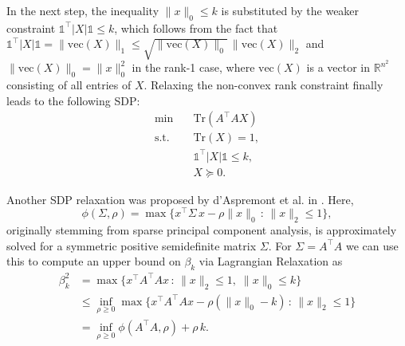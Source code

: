 \documentclass[journal]{IEEEtran}
\newcommand{\suchthat}{\,:\,}
\newcommand{\abs}[1]{\lvert{#1}\rvert}
\newcommand{\Norm}[2]{\lVert{#1}\rVert_{#2}}
\newcommand{\T}{^{\top}}
\newcommand{\Tr}{\text{Tr}}
\newcommand{\vect}{\text{vec}}
\newcommand{\R}{\mathds{R}}
\newcommand{\ones}{\mathds{1}}
\begin{document}
In the next step, the inequality $\Norm{x}{0} \leq k$ is substituted by the weaker constraint $\ones\T
\abs{X} \ones \leq k$, which follows from the fact that $\ones\T\abs{X} \ones = \Norm{\vect(X)}{1}\leq \sqrt{\Norm{\vect(X)}{0}}\, \Norm{\vect(X)}{2}$ and $\Norm{\vect(X)}{0}=\Norm{x}{0}^2$ in the rank-1 case, where $\vect(X)$ is a vector
in $\R^{n^2}$ consisting of all entries of $X$. 
Relaxing the non-convex rank constraint finally leads to the following SDP:
\begin{equation}\label{Asp07}\tag{A1}
 \begin{aligned}
  \min \quad & \Tr(A\T A X) \\
  \text{s.t.} \quad & \Tr(X) = 1, \\
  & \ones\T \abs{X} \ones \leq k, \\
  & X \succeq 0. \nonumber
 \end{aligned}
\end{equation}

Another SDP relaxation was proposed by d'Aspremont et al. in \cite{Asp08}. Here,
\begin{equation}\label{phi}
  \phi(\Sigma, \rho) = \max \big\{ x\T \Sigma\, x - \rho \Norm{x}{0} \suchthat \Norm{x}{2} \leq 1 \big\},
\end{equation}
originally stemming from sparse principal component analysis, is approximately solved for a symmetric positive semidefinite matrix $\Sigma$. For
$\Sigma = A\T A$ we can use this to compute an upper bound on $\beta_k$ via Lagrangian Relaxation as
 \begin{align*}
  \beta_k^2 & = \max \big\{ x\T A\T A x \suchthat \Norm{x}{2} \leq 1,\; \Norm{x}{0} \leq k \big\} \\
	    & \leq \inf_{\rho \geq 0} \max \big\{ x\T A\T A x - \rho 
            (\Norm{x}{0} - k) \suchthat \Norm{x}{2} \leq 1 \big\} \\
	    & = \inf_{\rho \geq 0} \phi(A\T A, \rho) + \rho\, k. 
 \end{align*}
\end{document}
